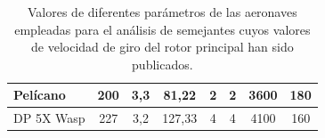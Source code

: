 \begin{table}[htbp]
\begin{tabular}{|l|c|c|c|c|c|c|c|}
		\hline
		\rowcolor[rgb]{ .949,  .949,  .949} Pelícano & \cellcolor[rgb]{ 1,  1,  1}200 & \cellcolor[rgb]{ 1,  1,  1}3,3 & \cellcolor[rgb]{ 1,  1,  1}81,22 & \cellcolor[rgb]{ 1,  1,  1}2 & \cellcolor[rgb]{ 1,  1,  1}2 & \cellcolor[rgb]{ 1,  1,  1}3600 & \cellcolor[rgb]{ 1,  1,  1}180 \\
		\hline
		\rowcolor[rgb]{ .949,  .949,  .949} DP 5X Wasp & \cellcolor[rgb]{ 1,  1,  1}227 & \cellcolor[rgb]{ 1,  1,  1}3,2 & \cellcolor[rgb]{ 1,  1,  1}127,33 & \cellcolor[rgb]{ 1,  1,  1}4 & \cellcolor[rgb]{ 1,  1,  1}4 & \cellcolor[rgb]{ 1,  1,  1}4100 & \cellcolor[rgb]{ 1,  1,  1}160 \\
		\hline
	\end{tabular}%
	\caption{Valores de diferentes parámetros de las aeronaves empleadas para el análisis de semejantes cuyos valores de velocidad de giro del rotor principal han sido publicados.}
	\label{ASomega}
\end{table}%

